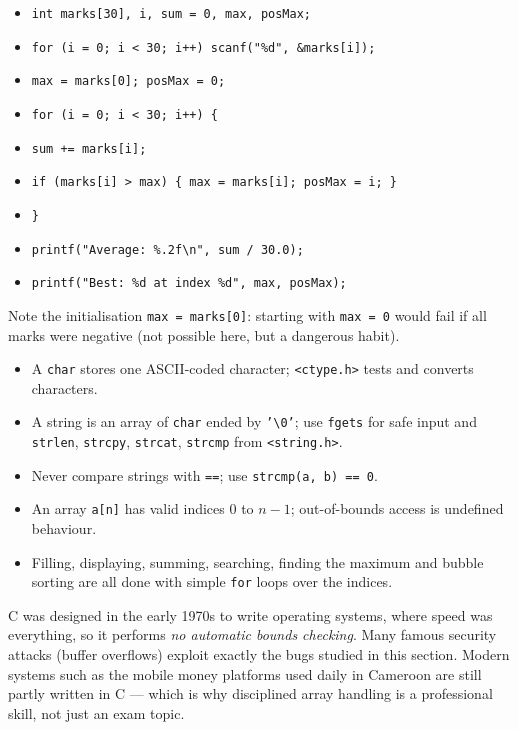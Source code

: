 \documentclass[11pt]{article}
\begin{document}
\begin{corrige}[Exercise 1]
\begin{itemize}
\item \texttt{int marks[30], i, sum = 0, max, posMax;}
\item \texttt{for (i = 0; i < 30; i++) scanf("\%d", \&marks[i]);}
\item \texttt{max = marks[0]; posMax = 0;}
\item \texttt{for (i = 0; i < 30; i++) \{}
\item \texttt{\quad sum += marks[i];}
\item \texttt{\quad if (marks[i] > max) \{ max = marks[i]; posMax = i; \}}
\item \texttt{\}}
\item \texttt{printf("Average: \%.2f\textbackslash n", sum / 30.0);}
\item \texttt{printf("Best: \%d at index \%d", max, posMax);}
\end{itemize}
Note the initialisation \texttt{max = marks[0]}: starting with \texttt{max = 0} would fail if all marks were negative (not possible here, but a dangerous habit).
\end{corrige}

\begin{aretenir}
\begin{itemize}
\item A \texttt{char} stores one ASCII-coded character; \texttt{<ctype.h>} tests and converts characters.
\item A string is an array of \texttt{char} ended by \texttt{'\textbackslash 0'}; use \texttt{fgets} for safe input and \texttt{strlen}, \texttt{strcpy}, \texttt{strcat}, \texttt{strcmp} from \texttt{<string.h>}.
\item Never compare strings with \texttt{==}; use \texttt{strcmp(a, b) == 0}.
\item An array \texttt{a[n]} has valid indices $0$ to $n-1$; out-of-bounds access is undefined behaviour.
\item Filling, displaying, summing, searching, finding the maximum and bubble sorting are all done with simple \texttt{for} loops over the indices.
\end{itemize}
\end{aretenir}

\begin{savaistu}
C was designed in the early 1970s to write operating systems, where speed was everything, so it performs \emph{no automatic bounds checking}. Many famous security attacks (buffer overflows) exploit exactly the bugs studied in this section. Modern systems such as the mobile money platforms used daily in Cameroon are still partly written in C — which is why disciplined array handling is a professional skill, not just an exam topic.
\end{savaistu}
\end{document}
